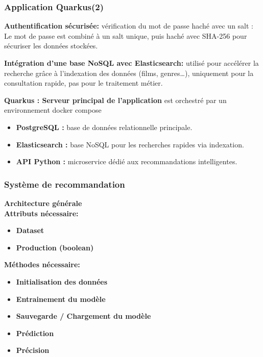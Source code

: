 \documentclass{beamer}
\begin{document}
\begin{frame}
    \scriptsize
    \frametitle{Application Quarkus(2)}
    \textbf{Authentification sécurisée: }vérification du mot de passe haché avec un salt : Le mot de passe est combiné à un salt unique, puis haché avec SHA-256 pour sécuriser les données stockées.

    \textbf{Intégration d’une base NoSQL avec Elasticsearch: } utilisé pour accélérer la recherche grâce à l’indexation des données (films, genres…), uniquement pour la consultation rapide, pas pour le traitement métier.

    \textbf{Quarkus : Serveur principal de l’application} est orchestré par un environnement docker compose
    \begin{itemize}
        \item \textbf{PostgreSQL :} base de données relationnelle principale.
        \item \textbf{Elasticsearch :} base NoSQL pour les recherches rapides via indexation.
        \item \textbf{API Python :} microservice dédié aux recommandations intelligentes.


    \end{itemize}



\end{frame}

\begin{frame}
    \scriptsize
    \frametitle{Système de recommandation}
    \vspace{0.3cm}
    {\large\textbf{Architecture générale}\\}
    \vspace{0.3cm}
    \textbf{Attributs nécessaire:}
    \begin{itemize}
        \item \textbf{Dataset}
        \item \textbf{Production (boolean)}
    \end{itemize}
    \vspace{0.3cm}
    \textbf{Méthodes nécessaire:}
    \begin{itemize}
        \item \textbf{Initialisation des données}
        \item \textbf{Entrainement du modèle}
        \item \textbf{Sauvegarde / Chargement du modèle}
        \item \textbf{Prédiction}
        \item \textbf{Précision}
    \end{itemize}
\end{frame}
\end{document}
